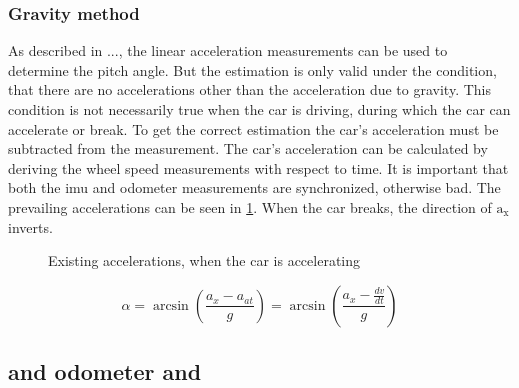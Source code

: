\subsubsection{Gravity method}
\label{subsubsec:gravity_method}
As described in ..., the linear acceleration measurements can be used to determine the pitch angle.
But the estimation is only valid under the condition, that there are no accelerations other than the acceleration due to gravity.
This condition is not necessarily true when the car is driving, during which the car can accelerate or break.
To get the correct estimation the car's acceleration must be subtracted from the measurement.
The car's acceleration can be calculated by deriving the wheel speed measurements with respect to time.
It is important that both the \gls{imu} and odometer measurements are synchronized, otherwise bad.
The prevailing accelerations can be seen in \cref{fig:tikz_car_gravity}.
When the car breaks, the direction of $\mathrm{a}_\mathrm{x}$ inverts.
\begin{figure}[htpb]
    \centering
    
    \caption{Existing accelerations, when the car is accelerating}
    \label{fig:tikz_car_gravity}
\end{figure}
\begin{equation}
    \alpha = \arcsin\left(\frac{a_x-a_{at}}{g}\right)
    = \arcsin\left(\frac{a_x-\frac{dv}{dt}}{g}\right)
\end{equation}


\subsection{ and odometer and }
